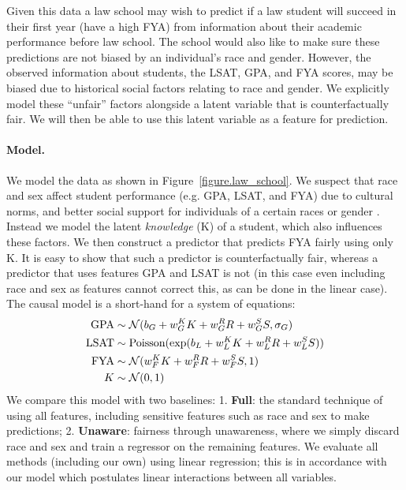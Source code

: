 Given this data a law school may wish to predict if a law student
will succeed in their first year (have a high FYA) from information about their academic performance 
before law school. The school would also like to make sure
these predictions are not biased by an individual's race and
gender. However, the observed information about
students, the LSAT, GPA, and FYA scores,  may be biased due to historical
social factors relating to race and gender. We explicitly model these
``unfair'' factors alongside a latent variable that is counterfactually
fair. We will then be able to use this latent variable as a feature
for prediction.

\paragraph{Model.}
We model the data as shown in Figure~\ref{figure.law_school}. We
suspect that race and sex affect student performance (e.g. GPA, LSAT,
and FYA) due to cultural norms, and better social support for individuals of a
certain races or gender%
. %
Instead we
 model the latent \emph{knowledge} (K) of a student,
which also influences these factors. We then construct a predictor
that predicts FYA fairly using only K. It is easy to show that such
a predictor is counterfactually fair, whereas a predictor that uses
features GPA and LSAT is not (in this case even including race and sex
as features cannot correct this, as can be done in the linear
case). The causal model is a short-hand for a system of equations:
\begin{align}
\mbox{GPA} &\sim {\cal N}(b_{G} + w_{G}^K K + w_{G}^R R + w_{G}^S S, \sigma_{G}) \nonumber \\
\mbox{LSAT} &\sim \textrm{Poisson}(\exp(b_{L} + w_{L}^K K + w_{L}^R R + w_{L}^S S)) \nonumber \\
\mbox{FYA} &\sim {\cal N}(w_{F}^K K + w_{F}^R R + w_{F}^S S, 1) \nonumber \\
K &\sim {\cal N}(0,1) \nonumber
\end{align}
We compare this model with two baselines: 1. \textbf{Full}: the standard technique of using all features, including sensitive features such as race and sex to make predictions; 2. \textbf{Unaware}: fairness through unawareness, where we simply discard race and sex and train a regressor on the remaining features. We evaluate all methods (including our own) using linear regression; this is in accordance with our model which postulates linear interactions between all variables. %


